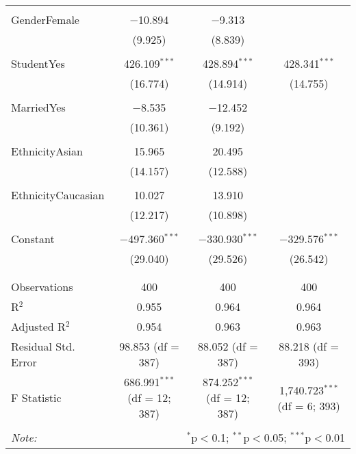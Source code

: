 \documentclass[11pt]{article}
\begin{document}
\begin{table}[!htbp]
{\begin{tabular}{@{\extracolsep{5pt}}lccc}
  & & & \\ 
 GenderFemale & $-$10.894 & $-$9.313 &  \\ 
  & (9.925) & (8.839) &  \\ 
  & & & \\ 
 StudentYes & 426.109$^{***}$ & 428.894$^{***}$ & 428.341$^{***}$ \\ 
  & (16.774) & (14.914) & (14.755) \\ 
  & & & \\ 
 MarriedYes & $-$8.535 & $-$12.452 &  \\ 
  & (10.361) & (9.192) &  \\ 
  & & & \\ 
 EthnicityAsian & 15.965 & 20.495 &  \\ 
  & (14.157) & (12.588) &  \\ 
  & & & \\ 
 EthnicityCaucasian & 10.027 & 13.910 &  \\ 
  & (12.217) & (10.898) &  \\ 
  & & & \\ 
 Constant & $-$497.360$^{***}$ & $-$330.930$^{***}$ & $-$329.576$^{***}$ \\ 
  & (29.040) & (29.526) & (26.542) \\ 
  & & & \\ 
\hline \\[-1.8ex] 
Observations & 400 & 400 & 400 \\ 
R$^{2}$ & 0.955 & 0.964 & 0.964 \\ 
Adjusted R$^{2}$ & 0.954 & 0.963 & 0.963 \\ 
Residual Std. Error & 98.853 (df = 387) & 88.052 (df = 387) & 88.218 (df = 393) \\ 
F Statistic & 686.991$^{***}$ (df = 12; 387) & 874.252$^{***}$ (df = 12; 387) & 1,740.723$^{***}$ (df = 6; 393) \\ 
\hline 
\hline \\[-1.8ex] 
\textit{Note:}  & \multicolumn{3}{r}{$^{*}$p$<$0.1; $^{**}$p$<$0.05; $^{***}$p$<$0.01} \\ 
\end{tabular}
} 
\end{table} 
\end{document}
